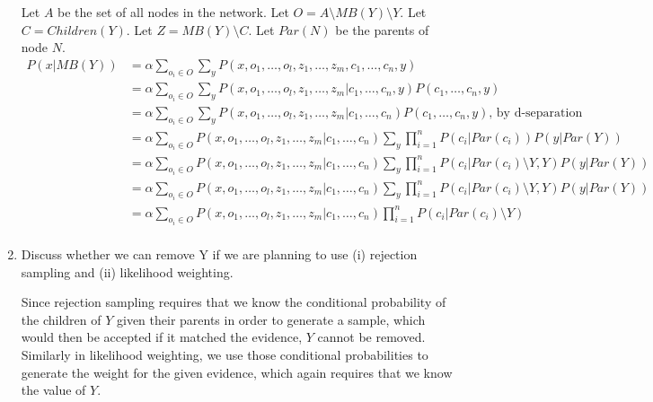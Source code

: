 \documentclass[12pt]{article}
\newenvironment{problem}[2][Problem]{\begin{trivlist}
\item[\hskip \labelsep {\bfseries #1}\hskip \labelsep {\bfseries #2.}]}{\end{trivlist}}
\begin{document}
\begin{problem}{5}
\begin{enumerate}
			Let $A$ be the set of all nodes in the network.
			Let $O=A \setminus MB(Y) \setminus Y$.
			Let $C=Children(Y)$.
			Let $Z=MB(Y) \setminus C$.
			Let $Par(N)$ be the parents of node $N$.
			\begin{align*}
				P(x|MB(Y))
				&=\alpha\sum_{o_i \in O}\sum_y P(x,o_1,\dots,o_l,z_1,\dots,z_m,c_1,\dots,c_n,y) \\
				&=\alpha\sum_{o_i \in O}\sum_y P(x,o_1,\dots,o_l,z_1,\dots,z_m|c_1,\dots,c_n,y)P(c_1,\dots,c_n,y) \\
				&=\alpha\sum_{o_i \in O}\sum_y P(x,o_1,\dots,o_l,z_1,\dots,z_m|c_1,\dots,c_n)P(c_1,\dots,c_n,y) \text{, by d-separation}\\
				&=\alpha\sum_{o_i \in O} P(x,o_1,\dots,o_l,z_1,\dots,z_m|c_1,\dots,c_n)\sum_y \prod_{i=1}^n P(c_i|Par(c_i))P(y|Par(Y)) \\
				&=\alpha\sum_{o_i \in O} P(x,o_1,\dots,o_l,z_1,\dots,z_m|c_1,\dots,c_n)\sum_y \prod_{i=1}^n P(c_i|Par(c_i)\setminus Y,Y)P(y|Par(Y)) \\
				&=\alpha\sum_{o_i \in O} P(x,o_1,\dots,o_l,z_1,\dots,z_m|c_1,\dots,c_n)\sum_y \prod_{i=1}^n P(c_i|Par(c_i)\setminus Y,Y)P(y|Par(Y)) \\
				&=\alpha\sum_{o_i \in O} P(x,o_1,\dots,o_l,z_1,\dots,z_m|c_1,\dots,c_n) \prod_{i=1}^n P(c_i|Par(c_i)\setminus Y) \\
			\end{align*}
		\item Discuss whether we can remove Y if we are planning to use (i) rejection sampling and (ii) likelihood weighting.

			Since rejection sampling requires that we know the conditional probability of the children of $Y$ given their parents
			in order to generate a sample, which would then be accepted if it matched the evidence, $Y$ cannot be removed.
			Similarly in likelihood weighting, we use those conditional probabilities to generate the weight for the given
			evidence, which again requires that we know the value of $Y$.
	\end{enumerate}
\end{problem}
\end{document}
